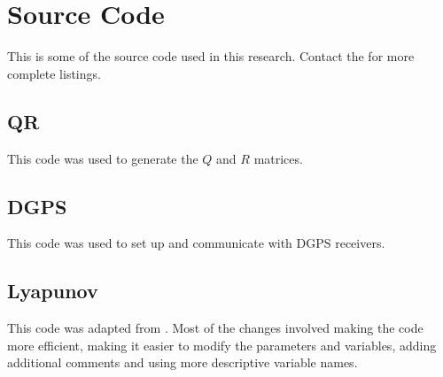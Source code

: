 \chapter{Source Code}
\label{ch:code}
This is some of the source code used in this research. Contact the  for more complete listings.

\section{QR}
\label{sec:qrcode}
This code was used to generate the $Q$ and $R$ matrices.
\lstset{language=C++}

\clearpage
\section{DGPS}
\label{sec:dgpscode}
This code was used to set up and communicate with DGPS receivers.

\clearpage
\section{Lyapunov}
\label{sec:lyapunovcode}
This code was adapted from \cite{Rusu05RobotuxLyapunov}. Most of the changes involved making the code more efficient, making it easier to modify the parameters and variables, adding additional comments and using more descriptive variable names.
\lstset{language=Matlab}
